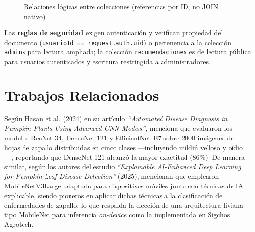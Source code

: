 \documentclass[12pt,a4paper]{article}
\begin{document}
\begin{figure}[H]
\centering
{}
\caption{Relaciones lógicas entre colecciones (referencias por ID, no JOIN nativo)}
\label{fig:er}
\end{figure}

Las \textbf{reglas de seguridad} exigen autenticación y verifican propiedad del
documento (\texttt{usuarioId == request.auth.uid}) o pertenencia a la colección
\texttt{admins} para lectura ampliada; la colección \texttt{recomendaciones} es
de lectura pública para usuarios autenticados y escritura restringida a
administradores.

\section{Trabajos Relacionados}

Según Hasan et al. (2024) en su artículo \textit{``Automated Disease Diagnosis
in Pumpkin Plants Using Advanced CNN Models''}, menciona que evaluaron los
modelos ResNet-34, DenseNet-121 y EfficientNet-B7 sobre 2000 imágenes de hojas
de zapallo distribuidas en cinco clases —incluyendo mildiú velloso y oídio—,
reportando que DenseNet-121 alcanzó la mayor exactitud (86\%). De manera
similar, según los autores del estudio \textit{``Explainable AI-Enhanced Deep
Learning for Pumpkin Leaf Disease Detection''} (2025), mencionan que emplearon
MobileNetV3Large adaptado para dispositivos móviles junto con técnicas de IA
explicable, siendo pioneros en aplicar dichas técnicas a la clasificación de
enfermedades de zapallo, lo que respalda la elección de una arquitectura
liviana tipo MobileNet para inferencia \textit{on-device} como la implementada
en Sigchos Agrotech.
\end{document}
